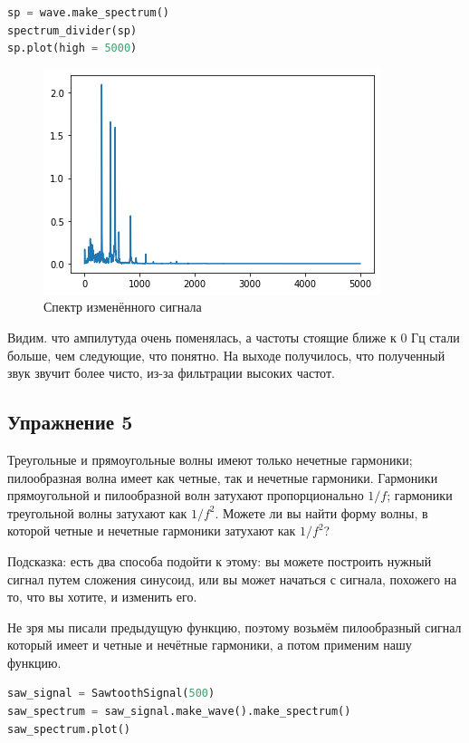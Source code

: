 \begin{lstlisting}[language=Python]
sp = wave.make_spectrum()
spectrum_divider(sp)
sp.plot(high = 5000)
\end{lstlisting}

\begin{figure}[H]
	\begin{center}
		\includegraphics[scale=1]{fig/lab02/lab02_36_0.png}
		\caption{Спектр изменённого сигнала}
	\end{center}
\end{figure}

Видим. что ампилутуда очень поменялась, а частоты стоящие ближе к 0 Гц стали больше, чем следующие, что понятно. На выходе получилось, что полученный звук звучит более чисто, из-за фильтрации высоких частот.

\subsection{Упражнение 5}

Треугольные и прямоугольные волны имеют только нечетные гармоники; пилообразная волна имеет как четные, так и нечетные гармоники. Гармоники прямоугольной и пилообразной волн затухают пропорционально $1/f$; гармоники треугольной волны затухают как $1/f^2$. Можете ли вы найти форму волны, в которой четные и нечетные гармоники затухают как $1/f^2$?

\noindent Подсказка: есть два способа подойти к этому: вы можете построить нужный сигнал путем сложения синусоид, или вы может начаться с сигнала, похожего на то, что вы хотите, и изменить его.


\noindent Не зря мы писали предыдущую функцию, поэтому возьмём пилообразный сигнал который имеет и четные и нечётные гармоники, а потом применим нашу функцию.

\begin{lstlisting}[language=Python]
saw_signal = SawtoothSignal(500)
saw_spectrum = saw_signal.make_wave().make_spectrum()
saw_spectrum.plot()
\end{lstlisting}

